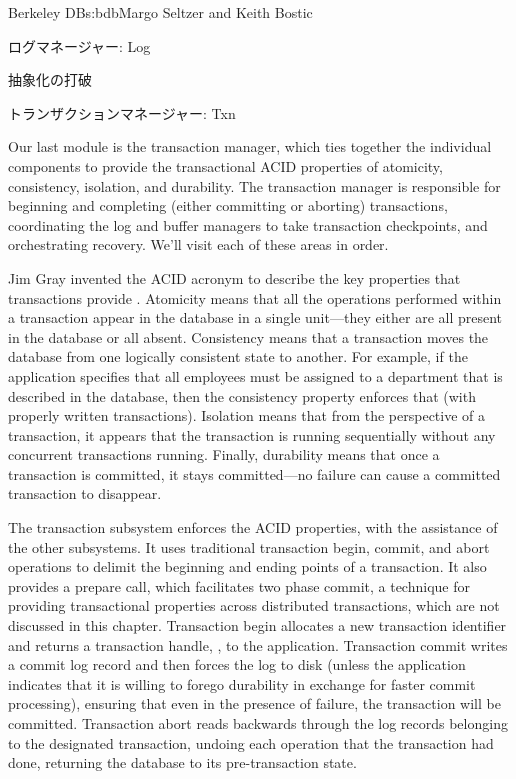 \begin{aosachapter}{Berkeley DB}{s:bdb}{Margo Seltzer and Keith Bostic}
\begin{aosasect1}{ログマネージャー: Log}
\begin{aosasect2}{抽象化の打破}
\end{aosasect2}

\end{aosasect1}

\begin{aosasect1}{トランザクションマネージャー: Txn}

Our last module is the transaction manager, which ties together the
individual components to provide the transactional ACID properties of
atomicity, consistency, isolation, and durability. The transaction
manager is responsible for beginning and completing (either committing
or aborting) transactions, coordinating the log and buffer managers to
take transaction checkpoints, and orchestrating recovery. We'll visit
each of these areas in order.


Jim Gray invented the ACID acronym to
describe the key properties that transactions provide \cite{bib:gray:trans}.  Atomicity
means that all the operations performed within a transaction appear in
the database in a single unit---they either are all present in the
database or all absent. Consistency means that a transaction moves the
database from one logically consistent state to another. For example,
if the application specifies that all employees must be assigned to a
department that is described in the database, then the consistency
property enforces that (with properly written transactions). Isolation
means that from the perspective of a transaction, it appears that the
transaction is running sequentially without any concurrent
transactions running. Finally, durability means that once a
transaction is committed, it stays committed---no failure can cause a
committed transaction to disappear.

The transaction subsystem enforces the ACID properties, with the
assistance of the other subsystems. It uses traditional transaction
begin, commit, and abort operations to delimit the beginning and
ending points of a transaction. It also provides a prepare call, which
facilitates two phase commit, a technique for providing transactional
properties across distributed transactions, which are not discussed in
this chapter. Transaction begin allocates a new transaction identifier
and returns a transaction handle, , to the application.
Transaction commit writes a commit log record and then forces the log
to disk (unless the application indicates that it is willing to forego
durability in exchange for faster commit processing), ensuring that
even in the presence of failure, the transaction will be
committed. Transaction abort reads backwards through the log records
belonging to the designated transaction, undoing each operation that
the transaction had done, returning the database to its
pre-transaction state.


\end{aosasect1}
\end{aosachapter}
